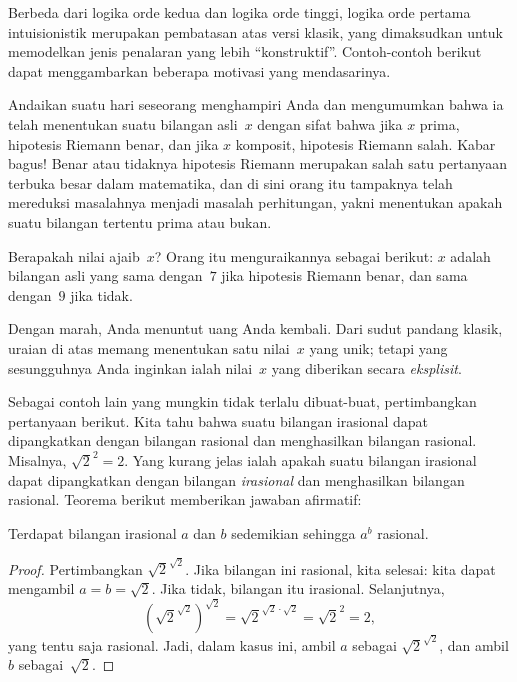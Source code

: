 \documentclass[../../../include/open-logic-section]{subfiles}
\begin{document}


Berbeda dari logika orde kedua dan logika orde tinggi, logika orde pertama
intuisionistik merupakan pembatasan atas versi klasik, yang dimaksudkan untuk
memodelkan jenis penalaran yang lebih ``konstruktif''. Contoh-contoh berikut
dapat menggambarkan beberapa motivasi yang mendasarinya.

Andaikan suatu hari seseorang menghampiri Anda dan mengumumkan bahwa ia telah
menentukan suatu bilangan asli~$x$ dengan sifat bahwa jika $x$ prima, hipotesis
Riemann benar, dan jika $x$ komposit, hipotesis Riemann salah. Kabar bagus!{}
Benar atau tidaknya hipotesis Riemann merupakan salah satu pertanyaan terbuka
besar dalam matematika, dan di sini orang itu tampaknya telah mereduksi
masalahnya menjadi masalah perhitungan, yakni menentukan apakah suatu bilangan
tertentu prima atau bukan.

Berapakah nilai ajaib~$x$? Orang itu menguraikannya sebagai berikut: $x$
adalah bilangan asli yang sama dengan~$7$ jika hipotesis Riemann benar, dan
sama dengan~$9$ jika tidak.

Dengan marah, Anda menuntut uang Anda kembali. Dari sudut pandang klasik,
uraian di atas memang menentukan satu nilai~$x$ yang unik; tetapi yang
sesungguhnya Anda inginkan ialah nilai~$x$ yang diberikan secara
\emph{eksplisit}.

Sebagai contoh lain yang mungkin tidak terlalu dibuat-buat, pertimbangkan
pertanyaan berikut. Kita tahu bahwa suatu bilangan irasional dapat dipangkatkan
dengan bilangan rasional dan menghasilkan bilangan rasional. Misalnya,
$\sqrt{2}^2 = 2$. Yang kurang jelas ialah apakah suatu bilangan irasional dapat
dipangkatkan dengan bilangan \emph{irasional} dan menghasilkan bilangan
rasional. Teorema berikut memberikan jawaban afirmatif:

\begin{thm}
Terdapat bilangan irasional $a$ dan $b$ sedemikian sehingga $a^b$ rasional.
\end{thm}

\begin{proof}
Pertimbangkan $\sqrt{2}^{\sqrt{2}}$. Jika bilangan ini rasional, kita selesai:
kita dapat mengambil $a = b = \sqrt{2}$. Jika tidak, bilangan itu irasional.
Selanjutnya,
\[
(\sqrt{2}^{\sqrt{2}})^{\sqrt{2}} = \sqrt{2}^{\sqrt{2} \cdot
  \sqrt{2}} = \sqrt{2}^2 = 2,
\]
yang tentu saja rasional. Jadi, dalam kasus ini, ambil $a$ sebagai
$\sqrt{2}^{\sqrt{2}}$, dan ambil $b$ sebagai~$\sqrt 2$.
\end{proof}
\end{document}
